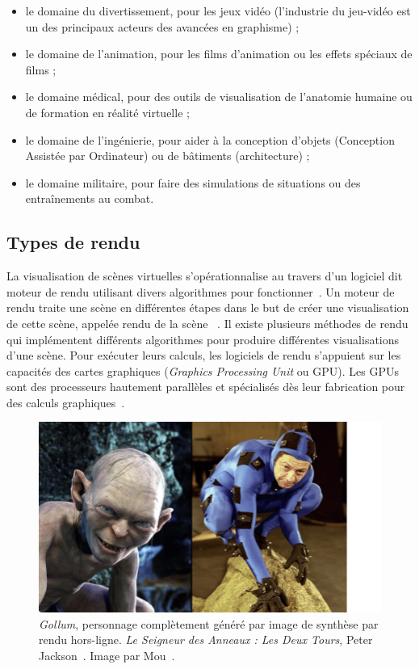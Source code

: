 \begin{itemize}
    \item le domaine du divertissement, pour les jeux vidéo (l'industrie du jeu-vidéo est un des principaux acteurs des avancées en graphisme) ;
    \item le domaine de l'animation, pour les films d'animation ou les effets spéciaux de films ;
    \item le domaine médical, pour des outils de visualisation de l'anatomie humaine ou de formation en réalité virtuelle ;
    \item le domaine de l'ingénierie, pour aider à la conception d'objets (Conception Assistée par Ordinateur) ou de bâtiments (architecture) ;
    \item le domaine militaire, pour faire des simulations de situations ou des entraînements au combat.
\end{itemize}

\subsection*{Types de rendu}

La visualisation de scènes virtuelles s'opérationnalise au travers d'un logiciel dit \og moteur de rendu \fg utilisant divers algorithmes pour fonctionner~\cite{sherman_chapter_2003}. Un moteur de rendu traite une scène en différentes étapes dans le but de créer une visualisation de cette scène, appelée \og rendu de la scène \fg~\cite{pharr_physically_2023}. Il existe plusieurs méthodes de rendu qui implémentent différents algorithmes pour produire différentes visualisations d'une scène. Pour exécuter leurs calculs, les logiciels de rendu s'appuient sur les capacités des cartes graphiques ({\it Graphics Processing Unit} ou GPU). Les GPUs sont des processeurs hautement parallèles et spécialisés dès leur fabrication pour des calculs graphiques~\cite{das_history_2016}.

\bigskip

\begin{figure}[h]
    \centering
    \includegraphics[width=.65\textwidth]{contenu/resources/images/gollum}
    \caption[{\it Gollum} (2002), {\it Le Seigneur des Anneaux : Les Deux Tours}]{{\it Gollum}, personnage complètement généré par image de synthèse par rendu hors-ligne. {\it Le Seigneur des Anneaux : Les Deux Tours}, Peter Jackson~\cite{jackson_lord_2002}. Image par Mou~\cite{mou_keyframe_2018}.}
    \label{fig:gollum}
\end{figure}

